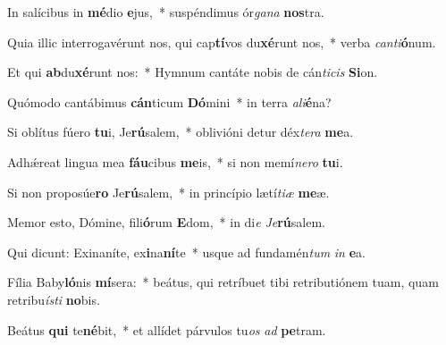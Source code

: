 \item In salícibus in \textbf{mé}dio \textbf{e}jus,~* suspéndimus ór\textit{ga}\textit{na} \textbf{nos}tra.
\item Quia illic interrogavérunt nos, qui cap\textbf{tí}vos du\textbf{xé}runt nos,~* verba \textit{can}\textit{ti}\textbf{ó}num.
\item Et qui \textbf{ab}du\textbf{xé}runt nos:~* Hymnum cantáte nobis de cán\textit{ti}\textit{cis} \textbf{Si}on.
\item Quómodo cantábimus \textbf{cán}ticum \textbf{Dó}mini~* in terra \textit{a}\textit{li}\textbf{é}na?
\item Si oblítus fúero \textbf{tu}i, Je\textbf{rú}salem,~* oblivióni detur déx\textit{te}\textit{ra} \textbf{me}a.
\item Adhǽreat lingua mea \textbf{fáu}cibus \textbf{me}is,~* si non memí\textit{ne}\textit{ro} \textbf{tu}i.
\item Si non proposúe\textbf{ro} Je\textbf{rú}salem,~* in princípio lætí\textit{ti}\textit{æ} \textbf{me}æ.
\item Memor esto, Dómine, fili\textbf{ó}rum \textbf{E}dom,~* in di\textit{e} \textit{Je}\textbf{rú}salem.
\item Qui dicunt: Exinaníte, ex\textbf{i}na\textbf{ní}te~* usque ad fundamén\textit{tum} \textit{in} \textbf{e}a.
\item Fília Baby\textbf{ló}nis \textbf{mí}sera:~* beátus, qui retríbuet tibi retributiónem tuam, quam retribu\textit{ís}\textit{ti} \textbf{no}bis.
\item Beátus \textbf{qui} te\textbf{né}bit,~* et allídet párvulos tu\textit{os} \textit{ad} \textbf{pe}tram.
